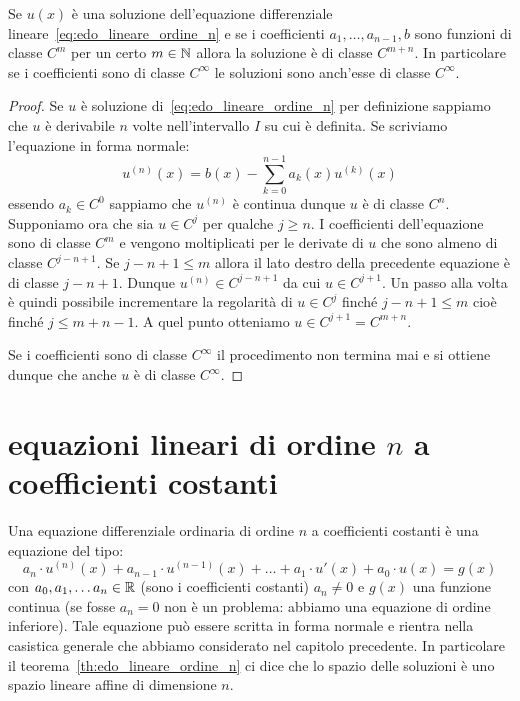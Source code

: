 \begin{theorem}%
  \label{th:maggiore_regolarita}%
Se $u(x)$ è una soluzione dell'equazione differenziale lineare~\eqref{eq:edo_lineare_ordine_n} e se i coefficienti $a_1, \dots, a_{n-1}, b$ sono funzioni di classe $C^m$ per un certo $m\in {\mathbb N}$ allora la soluzione è di classe $C^{m+n}$. In particolare se i coefficienti sono di classe $C^\infty$ le soluzioni sono anch'esse di classe $C^\infty$.
\end{theorem}
%
\begin{proof}
Se $u$ è soluzione di~\eqref{eq:edo_lineare_ordine_n}
per definizione sappiamo che $u$ è derivabile $n$ volte nell'intervallo $I$
su cui è definita.
Se scriviamo l'equazione in forma normale:
\[
  u^{(n)}(x) = b(x) - \sum_{k=0}^{n-1}a_k(x) u^{(k)}(x)
\]
essendo $a_k \in C^0$ sappiamo che $u^{(n)}$ è continua dunque $u$ è di classe $C^n$.
Supponiamo ora che sia $u\in C^j$ per qualche $j\ge n$.
I coefficienti dell'equazione sono di classe $C^m$ e vengono moltiplicati per le derivate di $u$ che sono almeno di classe $C^{j-n+1}$.
Se $j-n+1 \le m$ allora il lato destro della precedente equazione è di classe $j-n+1$.
Dunque $u^{(n)}\in C^{j-n+1}$ da cui $u\in C^{j+1}$.
Un passo alla volta è quindi possibile incrementare la regolarità di $u\in C^j$ finché $j-n+1\le m$ cioè finché $j\le m+n-1$. A quel punto otteniamo $u\in C^{j+1} = C^{m+n}$.

Se i coefficienti sono di classe $C^\infty$ il procedimento non termina mai
e si ottiene dunque che anche $u$ è di classe $C^\infty$.
\end{proof}

\section{equazioni lineari di ordine $n$ a coefficienti costanti}

Una equazione differenziale ordinaria di ordine $n$ a coefficienti costanti è una equazione del tipo:
\mymark{***}
\begin{equation}\label{eq:edo_lineare_omogenea_coeff_costanti_non_omogenea}
  a_n\cdot u^{(n)}(x) + a_{n-1} \cdot u^{(n-1)}(x) + \dots + a_1 \cdot u'(x) + a_0 \cdot u(x) = g(x) 
\end{equation}
con $a_0, a_1, \dots a_n \in {\mathbb R}$ (sono i coefficienti costanti) $a_n\neq 0$ e $g(x)$ una funzione continua
(se fosse $a_n=0$ non è un problema: abbiamo una equazione di ordine inferiore).
Tale equazione può essere scritta in forma normale e rientra 
nella casistica generale che abbiamo considerato nel capitolo precedente.
In particolare 
il teorema~\ref{th:edo_lineare_ordine_n}
ci dice che lo spazio delle soluzioni è uno spazio lineare affine di dimensione $n$.


